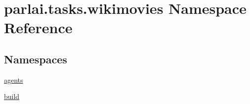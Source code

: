 \hypertarget{namespaceparlai_1_1tasks_1_1wikimovies}{}\section{parlai.\+tasks.\+wikimovies Namespace Reference}
\label{namespaceparlai_1_1tasks_1_1wikimovies}
\subsection*{Namespaces}
\begin{DoxyCompactItemize}
\item 
 \hyperlink{namespaceparlai_1_1tasks_1_1wikimovies_1_1agents}{agents}
\item 
 \hyperlink{namespaceparlai_1_1tasks_1_1wikimovies_1_1build}{build}
\end{DoxyCompactItemize}
